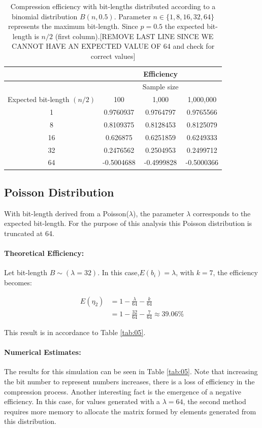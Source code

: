 \documentclass[10pt]{article}
\begin{document}
\begin{table}[h]
  \centering
  \caption{Compression efficiency with bit-lengths distributed according to a binomial distribution $B(n,0.5)$. Parameter $n \in \{1, 8, 16, 32, 64\}$ represents the maximum bit-length. Since $p=0.5$ the expected bit-length is $n/2$ (first column).[REMOVE LAST LINE SINCE WE CANNOT HAVE AN EXPECTED VALUE OF 64 and check for correct values]} 
 \begin{tabular}{cccc}
    \hline
			& 		&Efficiency         & \\
    \hline
			&  		&Sample size & \\
    Expected bit-length $(n/2)$		& 100		& 1,000		    & 1,000,000 \\
    \hline
     1 			&  0.9760937	& 0.9764797 	    & 0.9765566 \\
     8			&  0.8109375	& 0.8128453 	    & 0.8125079 \\
     16			&  0.626875	& 0.6251859 	    & 0.6249333 \\
     32			&  0.2476562	& 0.2504953 	    & 0.2499712 \\
     64			&  -0.5004688	& -0.4999828 	    & -0.5000366 \\
    \hline
 \end{tabular}
 \label{tab:04}
\end{table}
\subsection*{Poisson Distribution}
With bit-length derived from a Poisson($\lambda$), the parameter $\lambda$ corresponds to the expected bit-length. For the purpose of this analysis this Poisson distribution is truncated at 64. 
\paragraph{Theoretical Efficiency:}
Let bit-length $B \sim (\lambda=32)$. In this case,$E(b_i) = \lambda$, with $k=7$,  the efficiency becomes:

\begin{align}\label{eq:49}
 E(\eta_2) &= 1 - \frac{\lambda}{64} - \frac{k}{64} \\
 &= 1 - \frac{32}{64} - \frac{7}{64} \approx 39.06\%
\end{align}

This result is in accordance to Table \ref{tab:05}.
\paragraph{Numerical Estimates:}
The results for this simulation can be seen in Table \ref{tab:05}. Note that increasing the bit number to represent numbers increases, there is a loss of efficiency in the compression process. Another interesting fact is the emergence of a negative efficiency. In this case, for values ​​generated with a $\lambda=64$, the second method requires more memory to allocate the matrix formed by elements generated from this distribution.
\end{document}
